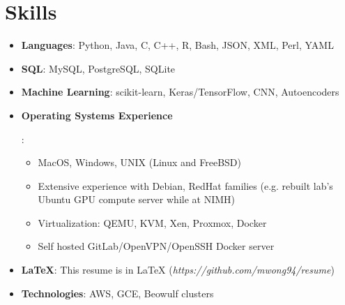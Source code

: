 \documentclass[letterpaper,10pt]{article}
\newcommand{\resumeSubHeadingListStart}{\begin{itemize}[leftmargin=*]}
\newcommand{\resumeSubHeadingListEnd}{\end{itemize}}
\begin{document}
\section{Skills}
  \resumeSubHeadingListStart
    \item \textbf{Languages}{: Python, Java, C, C++, R, Bash, JSON, XML, Perl, YAML}
    \item \textbf{SQL}{: MySQL, PostgreSQL, SQLite}
    \item \textbf{Machine Learning}{: scikit-learn, Keras/TensorFlow, CNN, Autoencoders}
    \item{
      \textbf{Operating Systems Experience}{:
        \resumeSubHeadingListStart
          \item{MacOS, Windows, UNIX (Linux and FreeBSD)}
          \item{Extensive experience with Debian, RedHat families
            (e.g. rebuilt lab's Ubuntu GPU compute server while at NIMH)}
          \item{Virtualization: QEMU, KVM, Xen, Proxmox, Docker}
          \item{Self hosted GitLab/OpenVPN/OpenSSH Docker server}
        \resumeSubHeadingListEnd}
    }
    \item \textbf{LaTeX}{: This resume is in LaTeX ({\sl https://github.com/mwong94/resume})}
    \item \textbf{Technologies}{: AWS, GCE, Beowulf clusters}
 \resumeSubHeadingListEnd


\end{document}
